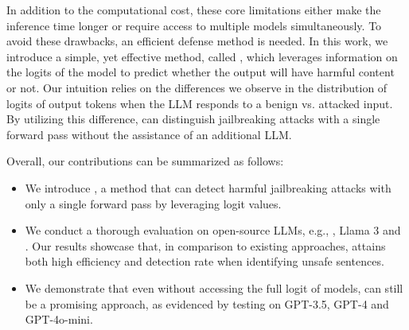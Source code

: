 In addition to the computational cost, these core limitations either make the inference time longer or require access to multiple models simultaneously. To avoid these drawbacks, an efficient defense method is needed. In this work, we introduce a simple, yet effective method, called \methodname{}, which leverages information on the logits of the model to predict whether the output will have harmful content or not. Our intuition relies on the differences we observe in the distribution of logits of output tokens when the LLM responds to a benign vs. attacked input. By utilizing this difference, \methodname{} can distinguish jailbreaking attacks with a single forward pass without the assistance of an additional LLM.


Overall, our contributions can be summarized as follows:
\begin{itemize}
\vspace{-1mm}
    \item We introduce \methodname{}, a method that can detect harmful jailbreaking attacks with only a single forward pass by leveraging logit values.
    \item We conduct a thorough evaluation on open-source LLMs, e.g., \llama{}, Llama 3 and \vicuna{}. Our results showcase that, in comparison to existing approaches, \methodname{} attains both high efficiency and detection rate when identifying unsafe sentences.
    \item We demonstrate that even without accessing the full logit of models, \methodname{} can still be a promising approach, as evidenced by testing on GPT-3.5, GPT-4 and GPT-4o-mini.
\end{itemize}
